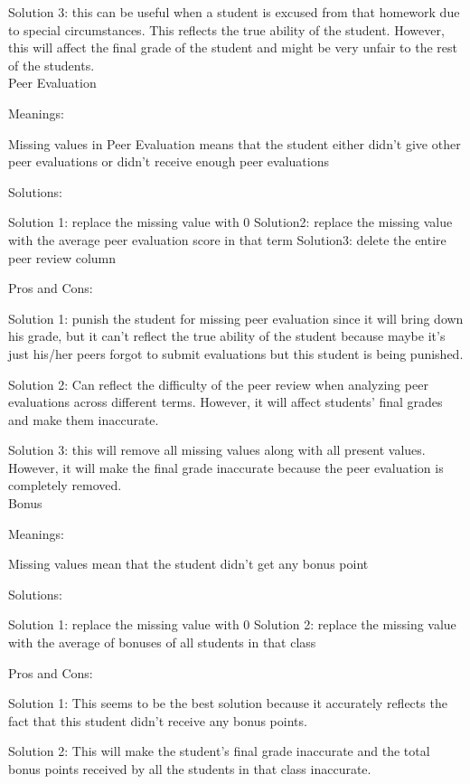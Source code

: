\documentclass[9pt,twoside]{exam}
\begin{document}
Solution 3: this can be useful when a student is excused from that homework due to special circumstances. This reflects the true ability of the student. However, this will affect the final grade of the student and might be very unfair to the rest of the students.\\


Peer Evaluation

Meanings:

Missing values in Peer Evaluation means that the student either didn't give other peer evaluations or didn't receive enough peer evaluations 


Solutions:

Solution 1: replace the missing value with 0
Solution2: replace the missing value with the average peer evaluation score in that term 
Solution3: delete the entire peer review column


Pros and Cons:


Solution 1: punish the student for missing peer evaluation since it will bring down his grade, but it can't reflect the true ability of the student because maybe it's just his/her peers forgot to submit evaluations but this student is being punished.

Solution 2: Can reflect the difficulty of the peer review when analyzing peer evaluations across different terms. However, it will affect students' final grades and make them inaccurate.

Solution 3: this will remove all missing values along with all present values. However, it will make the final grade inaccurate because the peer evaluation is completely removed. \\


Bonus


Meanings:


Missing values mean that the student didn't get any bonus point


Solutions:


Solution 1: replace the missing value with 0
Solution 2: replace the missing value with the average of bonuses of all students in that class


Pros and Cons:


Solution 1: This seems to be the best solution because it accurately reflects the fact that this student didn't receive any bonus points. 

Solution 2: This will make the student's final grade inaccurate and the total bonus points received by all the students in that class inaccurate.\\ 
\end{document}
